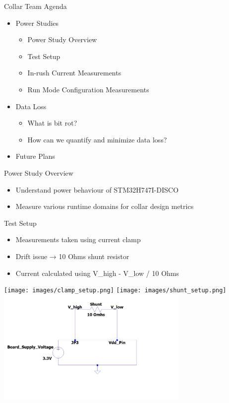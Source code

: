 \begin{frame}{Collar Team Agenda}
    \begin{itemize}
        \item Power Studies
        \begin{itemize}
            \item Power Study Overview
            \item Test Setup 
            \item In-rush Current Measurements
            \item Run Mode Configuration Measurements
        \end{itemize}
        \item Data Loss
        \begin{itemize}
            \item What is bit rot?
            \item How can we quantify and minimize data loss?
        \end{itemize}
        \item Future Plans
    \end{itemize}
\end{frame}

\begin{frame}{Power Study Overview}
    \begin{itemize}
        \item Understand power behaviour of STM32H747I-DISCO
        \item Measure various runtime domains for collar design metrics
    \end{itemize}
\end{frame}

\begin{frame}{Test Setup}
    \begin{itemize}
        \item Measurements taken using current clamp
        \item Drift issue → 10 Ohms shunt resistor
        \item Current calculated using V\_high - V\_low / 10 Ohms
    \end{itemize}  
    \texttt{[image: images/clamp\_setup.png]}
    \texttt{[image: images/shunt\_setup.png]}
    \includegraphics[height=0.35\textheight,width=0.7\textwidth,keepaspectratio]{images/shunt.png}
\end{frame}

